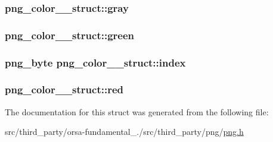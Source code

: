 \subsubsection[{gray}]{ png\+\_\+color\+\_\+\_\+struct\+::gray}\label{structpng__color__16__struct_a660a572a0a2f4094408f2fecb61571ac}
\hypertarget{structpng__color__16__struct_af01259ffd46c78eff9b1ad584a295126}{}
\subsubsection[{green}]{ png\+\_\+color\+\_\+\_\+struct\+::green}\label{structpng__color__16__struct_af01259ffd46c78eff9b1ad584a295126}
\hypertarget{structpng__color__16__struct_a44a918da0d9a50cf94fcad5a3c741ee0}{}
\subsubsection[{index}]{\setlength{\rightskip}{0pt plus 5cm}png\+\_\+byte png\+\_\+color\+\_\+\_\+struct\+::index}\label{structpng__color__16__struct_a44a918da0d9a50cf94fcad5a3c741ee0}
\hypertarget{structpng__color__16__struct_a069bad345aefbe4eab29fcc1d8af91e6}{}
\subsubsection[{red}]{ png\+\_\+color\+\_\+\_\+struct\+::red}\label{structpng__color__16__struct_a069bad345aefbe4eab29fcc1d8af91e6}


The documentation for this struct was generated from the following file\+:\begin{DoxyCompactItemize}
\item 
src/third\+\_\+party/orsa-\/fundamental\+\_./src/third\+\_\+party/png/\hyperlink{png_8h}{png.\+h}\end{DoxyCompactItemize}
